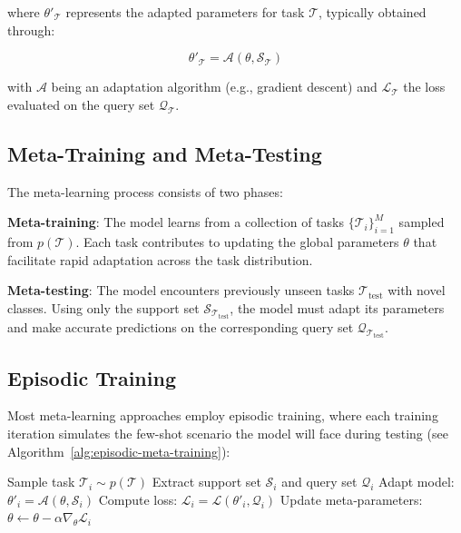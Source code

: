 where $\theta'_\mathcal{T}$ represents the adapted parameters for task $\mathcal{T}$, typically obtained through:

\begin{equation}
    \theta'_\mathcal{T} = \mathcal{A}(\theta, \mathcal{S}_\mathcal{T})
\end{equation}

with $\mathcal{A}$ being an adaptation algorithm (e.g., gradient descent) and $\mathcal{L}_{\mathcal{T}}$ the loss evaluated on the query set $\mathcal{Q}_\mathcal{T}$.

\subsection{Meta-Training and Meta-Testing}

The meta-learning process consists of two phases:

\textbf{Meta-training}: The model learns from a collection of tasks $\{\mathcal{T}_i\}_{i=1}^M$ sampled from $p(\mathcal{T})$. Each task contributes to updating the global parameters $\theta$ that facilitate rapid adaptation across the task distribution.

\textbf{Meta-testing}: The model encounters previously unseen tasks $\mathcal{T}_\text{test}$ with novel classes. Using only the support set $\mathcal{S}_{\mathcal{T}_\text{test}}$, the model must adapt its parameters and make accurate predictions on the corresponding query set $\mathcal{Q}_{\mathcal{T}_\text{test}}$.

\subsection{Episodic Training}

Most meta-learning approaches employ episodic training, where each training iteration simulates the few-shot scenario the model will face during testing (see Algorithm~\ref{alg:episodic-meta-training}):

\begin{algorithm}[H]
  \caption{Episodic Meta‑Training}
  \label{alg:episodic-meta-training}
  \begin{algorithmic}[1]
      \State Sample task $\mathcal{T}_i\sim p(\mathcal{T})$
      \State Extract support set $\mathcal{S}_i$ and query set $\mathcal{Q}_i$
      \State Adapt model: $\theta'_i=\mathcal{A}(\theta,\mathcal{S}_i)$
      \State Compute loss: $\mathcal{L}_i=\mathcal{L}(\theta'_i,\mathcal{Q}_i)$
      \State Update meta‑parameters: $\theta\gets \theta-\alpha\nabla_\theta\mathcal{L}_i$
    \EndFor
  \end{algorithmic}
\end{algorithm}

